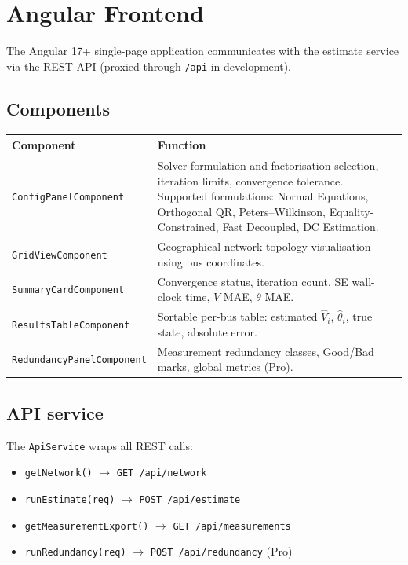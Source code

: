 \documentclass[11pt,a4paper]{article}
\begin{document}

\section{Angular Frontend}\label{sec:frontend}

The Angular 17+ single-page application communicates with the estimate
service via the REST API (proxied through \texttt{/api} in development).

\subsection{Components}

\begin{center}
\small
\begin{tabular}{lp{60mm}}
  \toprule
  \textbf{Component} & \textbf{Function} \\
  \midrule
  \texttt{ConfigPanelComponent}
    & Solver formulation and factorisation selection, iteration limits,
      convergence tolerance.  Supported formulations: Normal Equations,
      Orthogonal QR, Peters--Wilkinson, Equality-Constrained, Fast
      Decoupled, DC Estimation. \\
  \texttt{GridViewComponent}
    & Geographical network topology visualisation using bus coordinates. \\
  \texttt{SummaryCardComponent}
    & Convergence status, iteration count, SE wall-clock time, $V$ MAE,
      $\theta$ MAE. \\
  \texttt{ResultsTableComponent}
    & Sortable per-bus table: estimated $\hat{V}_i$, $\hat{\theta}_i$,
      true state, absolute error. \\
  \texttt{RedundancyPanelComponent}
    & Measurement redundancy classes, Good/Bad marks, global metrics
      (Pro). \\
  \bottomrule
\end{tabular}
\end{center}

\subsection{API service}

The \texttt{ApiService} wraps all REST calls:
\begin{itemize}
  \item \texttt{getNetwork()} $\to$ \texttt{GET /api/network}
  \item \texttt{runEstimate(req)} $\to$ \texttt{POST /api/estimate}
  \item \texttt{getMeasurementExport()} $\to$ \texttt{GET /api/measurements}
  \item \texttt{runRedundancy(req)} $\to$ \texttt{POST /api/redundancy} (Pro)
\end{itemize}
\end{document}
